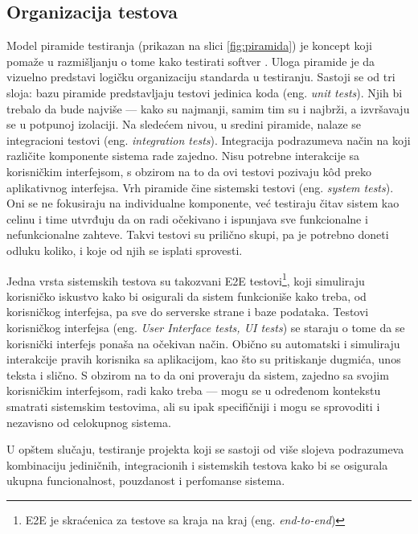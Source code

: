 \documentclass[12pt,oneside]{memoir}
\begin{document}
\subsection{Organizacija testova}
\par Model piramide testiranja (prikazan na slici \ref{fig:piramida}) je koncept koji pomaže u razmišljanju o tome kako testirati softver \cite{cohn}. Uloga piramide je da vizuelno predstavi logičku organizaciju standarda u testiranju. Sastoji se od tri sloja: bazu piramide predstavljaju testovi jedinica koda (eng. \emph{unit tests}). Njih bi trebalo da bude najviše --- kako su najmanji, samim tim su i najbrži, a izvršavaju se u potpunoj izolaciji. Na sledećem nivou, u sredini piramide, nalaze se integracioni testovi (eng. \emph{integration tests}). Integracija podrazumeva način na koji različite komponente sistema rade zajedno. Nisu potrebne interakcije sa korisničkim interfejsom, s obzirom na to da ovi testovi pozivaju k\^{o}d preko aplikativnog interfejsa. Vrh piramide čine sistemski testovi (eng. \emph{system tests}). Oni se ne fokusiraju na individualne komponente, već testiraju čitav sistem kao celinu i time utvrđuju da on radi očekivano i ispunjava sve funkcionalne i nefunkcionalne zahteve. Takvi testovi su prilično skupi, pa je potrebno doneti odluku koliko, i koje od njih se isplati sprovesti.
\par Jedna vrsta sistemskih testova su takozvani E2E testovi\footnote{E2E je skraćenica za testove sa kraja na kraj (eng. \emph{end-to-end})}, koji simuliraju korisničko iskustvo kako bi osigurali da sistem funkcioniše kako treba, od korisničkog interfejsa, pa sve do serverske strane i baze podataka. Testovi korisničkog interfejsa (eng. \emph{User Interface tests, UI tests}) se staraju o tome da se korisnički interfejs ponaša na očekivan način. Obično su automatski i simuliraju interakcije pravih korisnika sa aplikacijom, kao što su pritiskanje dugmića, unos teksta i slično. S obzirom na to da oni proveraju da sistem, zajedno sa svojim korisničkim interfejsom, radi kako treba --- mogu se u određenom kontekstu smatrati sistemskim testovima, ali su ipak specifičniji i mogu se sprovoditi i nezavisno od celokupnog sistema. 
\par U opštem slučaju, testiranje projekta koji se sastoji od više slojeva podrazumeva kombinaciju jediničnih, integracionih i sistemskih testova kako bi se osigurala ukupna funcionalnost, pouzdanost i perfomanse sistema.
\end{document}
